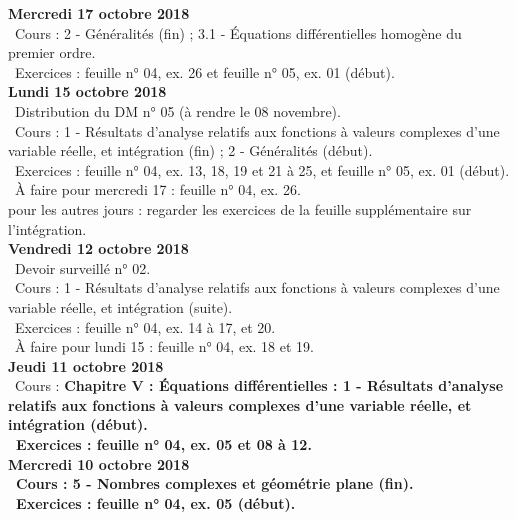 \documentclass[12pt,a4paper]{article}
\begin{document}
\noindent\textbf{\bf Mercredi 17 octobre 2018}\\
\bu\ Cours : 2 - Généralités (fin) ; 3.1 - Équations différentielles homogène du premier ordre.\\
\bu\ Exercices : feuille n° 04, ex. 26 et feuille n° 05, ex. 01 (début).\vspace{.4cm}\\
 
\noindent\textbf{Lundi 15 octobre 2018}\\
\bu\ Distribution du DM n° 05 (à rendre le 08 novembre).\\
\bu\ Cours : 1 - Résultats d'analyse relatifs aux fonctions à valeurs complexes d'une variable réelle, et intégration 
(fin) ; 2 - Généralités (début).\\
\bu\ Exercices : feuille n° 04, ex. 13, 18, 19 et 21 à 25, et feuille n° 05, ex. 01 (début).\\
\bu\ À faire pour mercredi 17 : feuille n° 04, ex. 26.\\
\bu pour les autres jours : regarder les exercices de la feuille supplémentaire sur l'intégration.\vspace{.4cm}\\
 
\noindent\textbf{Vendredi 12 octobre 2018}\\
\bu\ Devoir surveillé n° 02.\\
\bu\ Cours : 1 - Résultats d'analyse relatifs aux fonctions à valeurs complexes d'une variable réelle, et intégration 
(suite).\\
\bu\ Exercices : feuille n° 04, ex. 14 à 17, et 20.\\
\bu\ À faire pour lundi 15 : feuille n° 04, ex. 18 et 19.\vspace{.4cm}\\
 
\noindent\textbf{Jeudi 11 octobre 2018}\\
\bu\ Cours : \bf Chapitre V \rm : Équations différentielles : 1 - Résultats d'analyse relatifs aux fonctions à valeurs complexes d'une variable réelle, et intégration (début).\\
\bu\ Exercices : feuille n° 04, ex. 05 et 08 à 12.\vspace{.4cm}\\
 
\noindent\textbf{\bf Mercredi 10 octobre 2018}\\
\bu\ Cours : 5 - Nombres complexes et géométrie plane (fin).\\
\bu\ Exercices : feuille n° 04, ex. 05 (début).\vspace{.4cm}\\
 
\end{document}
